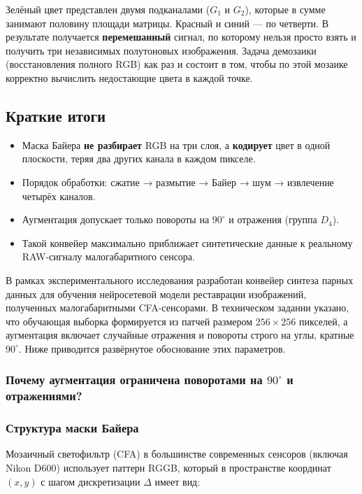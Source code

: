 \documentclass[12pt,a4paper]{article}
\begin{document}
Зелёный цвет представлен двумя подканалами ($G_1$ и $G_2$), которые в сумме занимают половину площади матрицы. Красный и синий — по четверти. В результате получается \textbf{перемешанный} сигнал, по которому нельзя просто взять и получить три независимых полутоновых изображения. Задача демозаики (восстановления полного RGB) как раз и состоит в том, чтобы по этой мозаике корректно вычислить недостающие цвета в каждой точке.

\subsection{Краткие итоги}

\begin{itemize}
    \item Маска Байера \textbf{не разбирает} RGB на три слоя, а \textbf{кодирует} цвет в одной плоскости, теряя два других канала в каждом пикселе.
    \item Порядок обработки: сжатие → размытие → Байер → шум → извлечение четырёх каналов.
    \item Аугментация допускает только повороты на $90^\circ$ и отражения (группа $D_4$).
    \item Такой конвейер максимально приближает синтетические данные к реальному RAW-сигналу малогабаритного сенсора.
\end{itemize}

В рамках экспериментального исследования разработан конвейер синтеза парных данных для обучения нейросетевой модели реставрации изображений, полученных малогабаритными CFA-сенсорами. В техническом задании указано, что обучающая выборка формируется из патчей размером $256\times256$ пикселей, а аугментация включает случайные отражения и повороты строго на углы, кратные $90^\circ$. Ниже приводится развёрнутое обоснование этих параметров.

\subsubsection{Почему аугментация ограничена поворотами на $90^\circ$ и отражениями?}

\subsubsection{Структура маски Байера}
Мозаичный светофильтр (CFA) в большинстве современных сенсоров (включая Nikon D600) использует паттерн RGGB, который в пространстве координат $(x,y)$ с шагом дискретизации $\Delta$ имеет вид:
\end{document}
